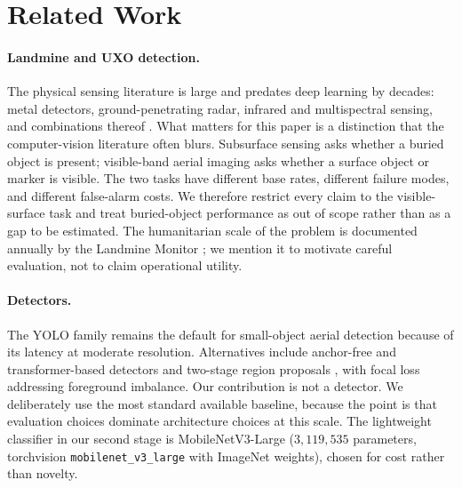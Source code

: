 \section{Related Work}
\label{sec:related}

\paragraph{Landmine and UXO detection.} The physical sensing literature is
large and predates deep learning by decades: metal detectors, ground-penetrating
radar, infrared and multispectral sensing, and combinations thereof
\citep{siegel2002landmine,kasban2010comparative}. What matters for this paper is
a distinction that the computer-vision literature often blurs. Subsurface sensing
asks whether a buried object is present; visible-band aerial imaging asks whether
a surface object or marker is visible. The two tasks have different base rates,
different failure modes, and different false-alarm costs. We therefore restrict
every claim to the visible-surface task and treat buried-object performance as
out of scope rather than as a gap to be estimated. The humanitarian scale of the
problem is documented annually by the Landmine Monitor \citep{icbl2023landmine};
we mention it to motivate careful evaluation, not to claim operational utility.

\paragraph{Detectors.} The YOLO family \citep{redmon2018yolov3,jocher2023ultralytics}
remains the default for small-object aerial detection because of its latency at
moderate resolution. Alternatives include anchor-free and transformer-based
detectors \citep{tian2019fcos,carion2020detr,zhao2024rtdetr} and two-stage
region proposals \citep{ren2015faster}, with focal loss
\citep{lin2017focal} addressing foreground imbalance. Our contribution is not a
detector. We deliberately use the most standard available baseline, because the
point is that evaluation choices dominate architecture choices at this scale. The
lightweight classifier in our second stage is MobileNetV3-Large
\citep{howard2019mobilenetv3} ($3{,}119{,}535$ parameters, torchvision
\texttt{mobilenet\_v3\_large} with ImageNet weights), chosen for cost rather than
novelty.

